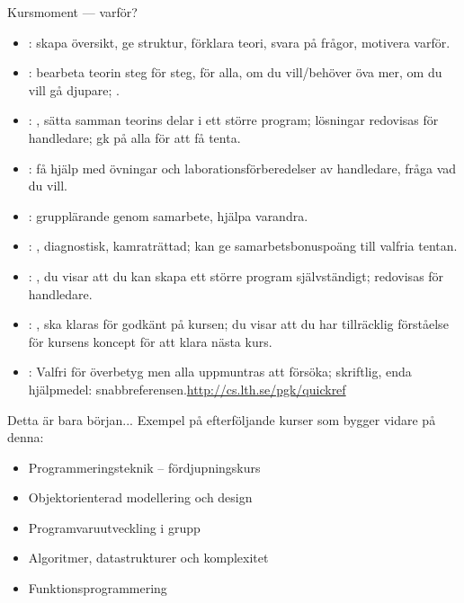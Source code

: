 \begin{Slide}{Kursmoment --- varför?}\SlideFontTiny
\begin{itemize}

\item {}: skapa översikt, ge struktur, förklara teori, svara på frågor, motivera varför.

\item {}: bearbeta teorin steg för steg,  för alla,  om du vill/behöver öva mer,  om du vill gå djupare; .

\item {}: , sätta samman teorins delar i ett större program; lösningar redovisas för handledare; gk på alla för att få tenta.

\item {}: få hjälp med övningar och laborationsförberedelser av handledare, fråga vad du vill.

\item {}: grupplärande genom samarbete, hjälpa varandra.

\item {}: , diagnostisk, kamraträttad; kan ge samarbetsbonuspoäng till valfria tentan.

\item {}: , du visar att du kan skapa ett större program självständigt; redovisas för handledare.
\item {}: , ska klaras för godkänt på kursen; du visar att du har tillräcklig förståelse för kursens koncept för att klara nästa kurs. 

\item {}: Valfri för överbetyg men alla uppmuntras att försöka; skriftlig, enda hjälpmedel: snabbreferensen.\url{http://cs.lth.se/pgk/quickref}
\end{itemize}
\end{Slide}

\ifkompendium\else
\begin{SlideExtra}{Detta är bara början... }
Exempel på efterföljande kurser som bygger vidare på denna:
\begin{itemize}
\item Programmeringsteknik -- fördjupningskurs
\item Objektorienterad modellering och design
\item Programvaruutveckling i grupp
\item Algoritmer, datastrukturer och komplexitet
\item Funktionsprogrammering
\end{itemize}
\end{SlideExtra}


